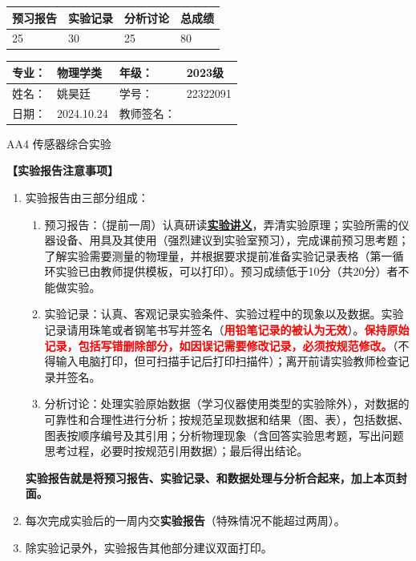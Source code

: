 \documentclass[dvipsnames, svgnames,a4paper,11pt]{article}
\begin{document}
\begin{table}
	\renewcommand\arraystretch{1.7}
	\begin{tabularx}{\textwidth}{
		|X|X|X|X
		|X|X|X|X|}
	\hline
	\multicolumn{2}{|c|}{预习报告}&\multicolumn{2}{|c|}{实验记录}&\multicolumn{2}{|c|}{分析讨论}&\multicolumn{2}{|c|}{总成绩}\\
	\hline
	 25& &30  & &25  & &80& \\
	\hline
	\end{tabularx}
\end{table}


\begin{table}
	\renewcommand\arraystretch{1.7}
	\begin{tabularx}{\textwidth}{|X|X|X|X|}
	\hline
	专业：& 物理学类 &年级：& 2023级\\
	\hline
	姓名：& 姚昊廷  & 学号：&22322091\\
	\hline
	日期：& 2024.10.24& 教师签名：& \\
	\hline
	\end{tabularx}
\end{table}

\begin{center}
	\LARGE AA4 传感器综合实验
\end{center}

\textbf{【实验报告注意事项】}
\begin{enumerate}
	\item 实验报告由三部分组成：
	\begin{enumerate}
		\item 预习报告：（提前一周）认真研读\underline{\textbf{实验讲义}}，弄清实验原理；实验所需的仪器设备、用具及其使用（强烈建议到实验室预习），完成课前预习思考题；了解实验需要测量的物理量，并根据要求提前准备实验记录表格（第一循环实验已由教师提供模板，可以打印）。预习成绩低于10分（共20分）者不能做实验。
	    \item 实验记录：认真、客观记录实验条件、实验过程中的现象以及数据。实验记录请用珠笔或者钢笔书写并签名（\textcolor{red}{\textbf{用铅笔记录的被认为无效}}）。\textcolor{red}{\textbf{保持原始记录，包括写错删除部分，如因误记需要修改记录，必须按规范修改。}}（不得输入电脑打印，但可扫描手记后打印扫描件）；离开前请实验教师检查记录并签名。
	    \item 分析讨论：处理实验原始数据（学习仪器使用类型的实验除外），对数据的可靠性和合理性进行分析；按规范呈现数据和结果（图、表），包括数据、图表按顺序编号及其引用；分析物理现象（含回答实验思考题，写出问题思考过程，必要时按规范引用数据）；最后得出结论。
	\end{enumerate}
	\textbf{实验报告就是将预习报告、实验记录、和数据处理与分析合起来，加上本页封面。}
	\item 每次完成实验后的一周内交\textbf{实验报告}（特殊情况不能超过两周）。
	\item 除实验记录外，实验报告其他部分建议双面打印。
\end{enumerate}
\end{document}
